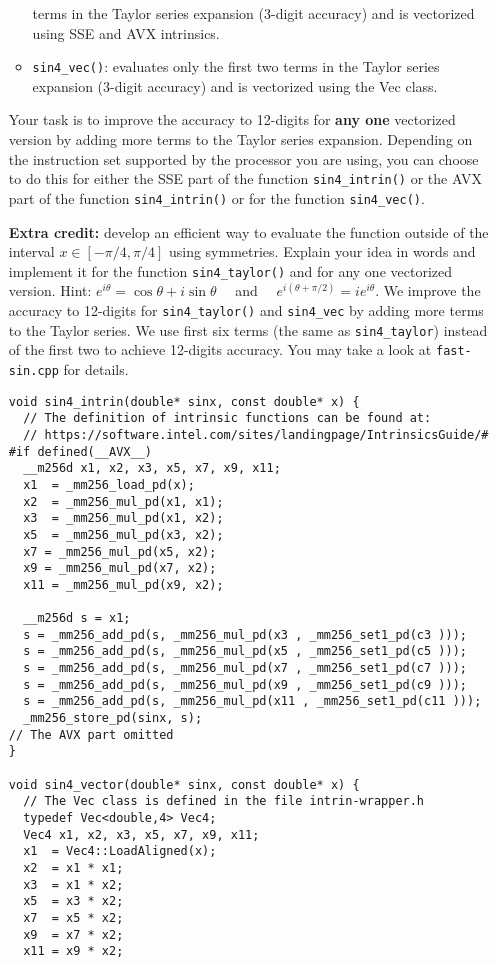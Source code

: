 \documentclass[12pt]{article}
\begin{document}
\begin{enumerate}
\begin{itemize}
        terms in the Taylor series expansion (3-digit accuracy) and
        is vectorized using SSE and AVX intrinsics.
      \item \texttt{sin4\_vec()}: evaluates only the first two terms
        in the Taylor series expansion (3-digit accuracy) and
        is vectorized using the Vec class.
    \end{itemize}
    Your task is to improve the accuracy to 12-digits for {\bf any one}
    vectorized version by adding more terms to the Taylor series
    expansion.  Depending on the instruction set supported by the
    processor you are using, you can choose to do this for either the
    SSE part of the function \texttt{sin4\_intrin()} or the AVX part of
    the function \texttt{sin4\_intrin()} or for the function
    \texttt{sin4\_vec()}.

    {\bf Extra credit:} develop an efficient way to evaluate the
    function outside of the interval $x\in[-\pi/4,\pi/4]$ using
    symmetries.  Explain
    your idea in words and implement it for the function
    \texttt{sin4\_taylor()} and for any one vectorized version.
    Hint: $e^{i \theta} = \cos \theta + i \sin \theta$
    ~~and~~ $e^{i(\theta+\pi/2)} = i e^{i \theta}$.
\newpage
We improve the accuracy to 12-digits for \texttt{sin4\_taylor()} and \texttt{sin4\_vec} by adding more terms to the Taylor series. We use first six terms (the same as \texttt{sin4\_taylor}) instead of the first two to achieve 12-digits accuracy. You may take a look at \texttt{fast-sin.cpp} for details.
\begin{verbatim}
void sin4_intrin(double* sinx, const double* x) {
  // The definition of intrinsic functions can be found at:
  // https://software.intel.com/sites/landingpage/IntrinsicsGuide/#
#if defined(__AVX__)
  __m256d x1, x2, x3, x5, x7, x9, x11;
  x1  = _mm256_load_pd(x);
  x2  = _mm256_mul_pd(x1, x1);
  x3  = _mm256_mul_pd(x1, x2);
  x5  = _mm256_mul_pd(x3, x2);
  x7 = _mm256_mul_pd(x5, x2);
  x9 = _mm256_mul_pd(x7, x2);
  x11 = _mm256_mul_pd(x9, x2);

  __m256d s = x1;
  s = _mm256_add_pd(s, _mm256_mul_pd(x3 , _mm256_set1_pd(c3 )));
  s = _mm256_add_pd(s, _mm256_mul_pd(x5 , _mm256_set1_pd(c5 )));
  s = _mm256_add_pd(s, _mm256_mul_pd(x7 , _mm256_set1_pd(c7 )));
  s = _mm256_add_pd(s, _mm256_mul_pd(x9 , _mm256_set1_pd(c9 )));
  s = _mm256_add_pd(s, _mm256_mul_pd(x11 , _mm256_set1_pd(c11 )));
  _mm256_store_pd(sinx, s);
// The AVX part omitted
}

void sin4_vector(double* sinx, const double* x) {
  // The Vec class is defined in the file intrin-wrapper.h
  typedef Vec<double,4> Vec4;
  Vec4 x1, x2, x3, x5, x7, x9, x11;
  x1  = Vec4::LoadAligned(x);
  x2  = x1 * x1;
  x3  = x1 * x2;
  x5  = x3 * x2;
  x7  = x5 * x2;
  x9  = x7 * x2;
  x11 = x9 * x2;


\end{verbatim}
\end{enumerate}
\end{document}
